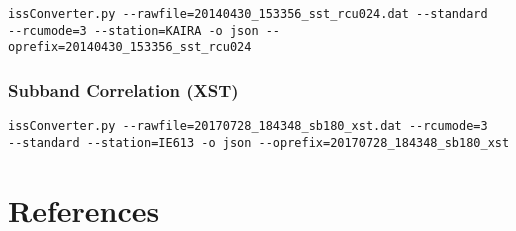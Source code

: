 \documentclass[10pt,a4paper]{article}
\begin{document}
\begin{verbatim}
issConverter.py --rawfile=20140430_153356_sst_rcu024.dat --standard
--rcumode=3 --station=KAIRA -o json --oprefix=20140430_153356_sst_rcu024
\end{verbatim}


\subsubsection{Subband Correlation (XST)}

\begin{verbatim}
issConverter.py --rawfile=20170728_184348_sb180_xst.dat --rcumode=3
--standard --station=IE613 -o json --oprefix=20170728_184348_sb180_xst
\end{verbatim}

\section{References}



\end{document}
